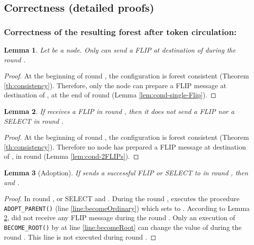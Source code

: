 \documentclass[twocolumn]{article}
\newtheorem{lemma}{Lemma}
\newcommand{\depends}[1]{}
\begin{document}
\subsection{Correctness (detailed proofs)}


\subsubsection{Correctness of the resulting forest after token circulation:}

\begin{lemma}
  \label{lem:single-Flip}
  Let  be a node. Only 
 can  send a FLIP at destination of  during the round .
\depends{\ref{th:consistency}, \ref{lem:cond-single-Flip})}
\end{lemma}

\begin{proof}
At the beginning of round , the configuration is forest consistent
(Theorem \ref{th:consistency}).
Therefore, only the node   can prepare 
a FLIP message at destination of , 
at the end of round  (Lemma \ref{lem:cond-single-Flip}).
 \end{proof}

\begin{lemma}
 \label{lem:2FLIPs}
 If  receives a FLIP in round , then it does not 
send a FLIP nor a SELECT in round .
\depends{\ref{th:consistency},  \ref{lem:FLIP-SELECT-T}, \ref{lem:L5}}
\end{lemma}
\begin{proof}
At the beginning of round , the configuration is forest consistent
(Theorem \ref{th:consistency}).
Therefore no node has prepared a FLIP message at destination of , 
in round  (Lemma \ref{lem:cond-2FLIPs}).
 \end{proof}


\begin{lemma}[Adoption]
\label{lem:adoption}
If  sends a successful FLIP or SELECT to  in round , then  and .
\depends{\ref{lem:2FLIPs}}
\end{lemma}

\begin{proof}
In round ,  or SELECT  
and . 
During the round ,  executes the procedure \texttt{ADOPT\_PARENT()} 
(line \ref{line:becomeOrdinary})  
which sets  to . 
According to Lemma \ref{lem:2FLIPs},  did not receive any FLIP 
message during the round .
Only an execution of \texttt{BECOME\_ROOT()} by  
at line \ref{line:becomeRoot} can 
change the value of  
during the round . This line is not executed during round .
 \end{proof}
\end{document}
